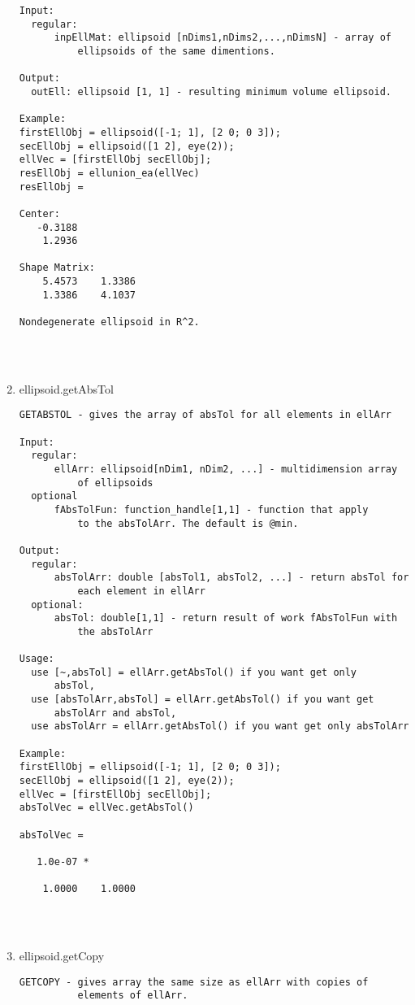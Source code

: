 \begin{enumerate}
\begin{lstlisting}
Input:
  regular:
      inpEllMat: ellipsoid [nDims1,nDims2,...,nDimsN] - array of
          ellipsoids of the same dimentions.

Output:
  outEll: ellipsoid [1, 1] - resulting minimum volume ellipsoid.

Example:
firstEllObj = ellipsoid([-1; 1], [2 0; 0 3]);
secEllObj = ellipsoid([1 2], eye(2));
ellVec = [firstEllObj secEllObj];
resEllObj = ellunion_ea(ellVec)
resEllObj =

Center:
   -0.3188
    1.2936

Shape Matrix:
    5.4573    1.3386
    1.3386    4.1037

Nondegenerate ellipsoid in R^2.




\end{lstlisting}
\fontfamily{\familydefault}
\selectfont
\item {ellipsoid.getAbsTol}
\selectfont
\begin{lstlisting}
GETABSTOL - gives the array of absTol for all elements in ellArr

Input:
  regular:
      ellArr: ellipsoid[nDim1, nDim2, ...] - multidimension array
          of ellipsoids
  optional
      fAbsTolFun: function_handle[1,1] - function that apply
          to the absTolArr. The default is @min.

Output:
  regular:
      absTolArr: double [absTol1, absTol2, ...] - return absTol for
          each element in ellArr
  optional:
      absTol: double[1,1] - return result of work fAbsTolFun with
          the absTolArr

Usage:
  use [~,absTol] = ellArr.getAbsTol() if you want get only
      absTol,
  use [absTolArr,absTol] = ellArr.getAbsTol() if you want get
      absTolArr and absTol,
  use absTolArr = ellArr.getAbsTol() if you want get only absTolArr

Example:
firstEllObj = ellipsoid([-1; 1], [2 0; 0 3]);
secEllObj = ellipsoid([1 2], eye(2));
ellVec = [firstEllObj secEllObj];
absTolVec = ellVec.getAbsTol()

absTolVec =

   1.0e-07 *

    1.0000    1.0000




\end{lstlisting}
\fontfamily{\familydefault}
\selectfont
\item {ellipsoid.getCopy}
\selectfont
\begin{lstlisting}
GETCOPY - gives array the same size as ellArr with copies of
          elements of ellArr.


\end{lstlisting}
\end{enumerate}
